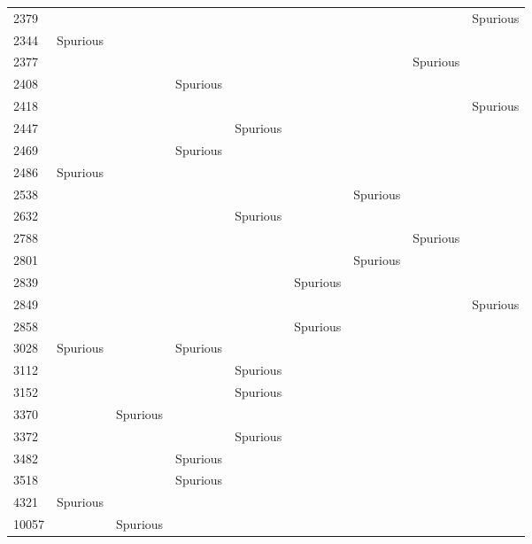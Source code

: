 \begin{table}
\begin{tabular}{lllllllll}
2379  &              &              &              &              &              &              &              & Spurious \\
2344  & Spurious \\
2377  &              &              &              &              &              &              & Spurious \\
2408  &              &              & Spurious \\
2418  &              &              &              &              &              &              &              & Spurious \\
2447  &              &              &              & Spurious \\
2469  &              &              & Spurious \\
2486  & Spurious \\
2538  &              &              &              &              &              & Spurious \\
2632  &              &              &              & Spurious \\
2788  &              &              &              &              &              &              & Spurious \\
2801  &              &              &              &              &              & Spurious \\
2839  &              &              &              &             & Spurious \\
2849  &              &              &              &              &              &              &              & Spurious \\
2858  &              &              &              &             & Spurious \\
3028  & Spurious     &              & Spurious \\
3112  &              &              &              & Spurious \\
3152  &              &              &              & Spurious \\
3370  &              & Spurious \\
3372  &              &              &              & Spurious \\
3482  &              &              & Spurious \\
3518  &              &              & Spurious \\
4321  & Spurious \\
10057 &              & Spurious \\

\end{tabular}
\end{table}

